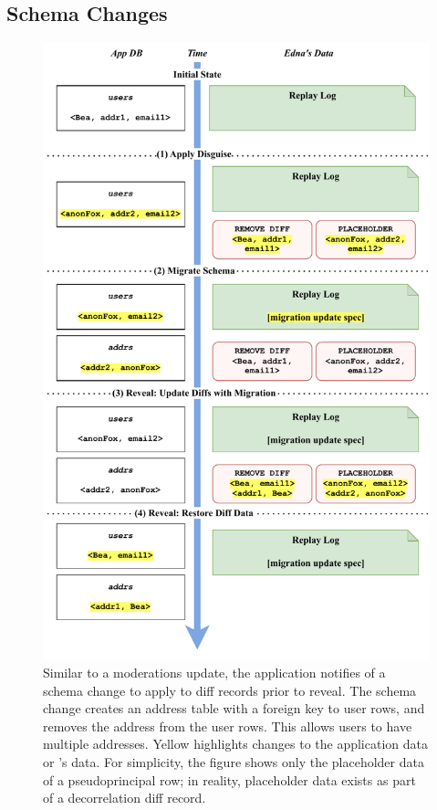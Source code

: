 \subsection{Schema Changes}
\begin{figure}
    \centering
    \includegraphics[width=.8\textwidth]{figs/update-migration}
    \caption[During reveal, \sys applies reveal-time update specifications for
    schema changes.]{Similar to a moderations update, the
    application notifies \sys of a schema change to apply to diff records
    prior to reveal. The schema change creates an address table with a foreign
    key to user rows, and removes the address from the user rows. This allows users to have multiple addresses.
    Yellow highlights changes to the application data or \sys's
    data. For simplicity, the figure shows only the placeholder data of a pseudoprincipal row; in reality, placeholder data exists as part of \eg a decorrelation
    diff record.}
\label{f:update:schema}
\end{figure}

